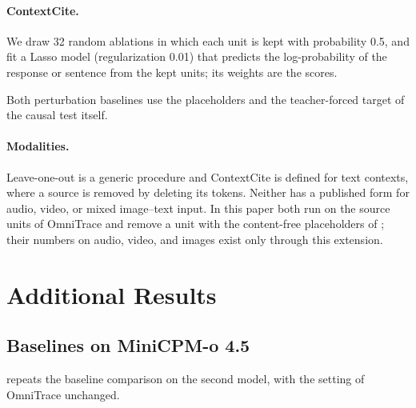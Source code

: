 \paragraph{ContextCite.}
We draw 32 random ablations in which each unit is kept with probability 0.5, and fit a Lasso model (regularization 0.01) that predicts the log-probability of the response or sentence from the kept units; its weights are the scores.

Both perturbation baselines use the placeholders and the teacher-forced target of the causal test itself.

\paragraph{Modalities.}
Leave-one-out is a generic procedure and ContextCite is defined for text contexts, where a source is removed by deleting its tokens. Neither has a published form for audio, video, or mixed image--text input. In this paper both run on the source units of OmniTrace and remove a unit with the content-free placeholders of ; their numbers on audio, video, and images exist only through this extension.

\section{Additional Results}
\label{appendix:additional}

\subsection{Baselines on MiniCPM-o 4.5}
\label{appendix:minicpm}

\begin{table}[t]
\centering
\small
\setlength{\tabcolsep}{4.2pt}
\resizebox{\textwidth}{!}{}
\caption{The comparison of  repeated on MiniCPM-o~4.5: every baseline and both OmniTrace variants are run on this model. Columns as in . \mdn / \mup: reliably lower / higher than OmniTrace on this model on the same questions (paired 95\% bootstrap interval). $^\dagger$Self-citation is a separate generation ($^\ddagger$one extra pass), scored on the 210, 92, and 227 responses that cite; the document citation run covers 252 of the 400 questions.}
\label{tab:baselines_minicpm}
\end{table}

 repeats the baseline comparison on the second model, with the setting of OmniTrace unchanged.

